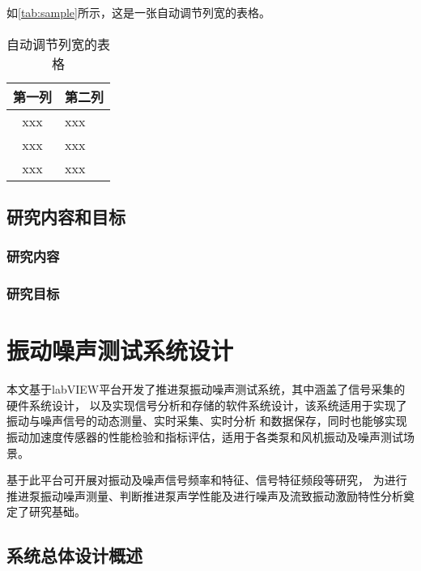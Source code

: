 \par 如\autoref{tab:sample}所示，这是一张自动调节列宽的表格。

\begin{table}[htbp]
    \caption{\label{tab:sample}自动调节列宽的表格}
    \begin{tabularx}{\linewidth}{c|X<{\centering}}
        \hline
        第一列 & 第二列 \\ \hline
        xxx & xxx \\ \hline
        xxx & xxx \\ \hline
        xxx & xxx \\ \hline
    \end{tabularx}
\end{table}
\section{研究内容和目标}
\subsection{研究内容}
\subsection{研究目标}

\chapter{振动噪声测试系统设计}

本文基于labVIEW平台开发了推进泵振动噪声测试系统，其中涵盖了信号采集的硬件系统设计，
以及实现信号分析和存储的软件系统设计，该系统适用于实现了振动与噪声信号的动态测量、实时采集、实时分析
和数据保存，同时也能够实现振动加速度传感器的性能检验和指标评估，适用于各类泵和风机振动及噪声测试场景。

基于此平台可开展对振动及噪声信号频率和特征、信号特征频段等研究，
为进行推进泵振动噪声测量、判断推进泵声学性能及进行噪声及流致振动激励特性分析奠定了研究基础。

\section{系统总体设计概述}


